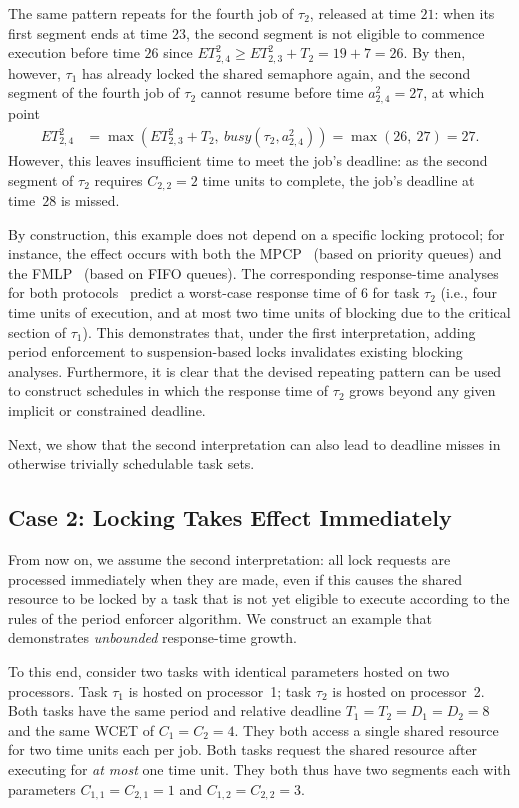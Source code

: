 The same pattern repeats for the fourth job of $\tau_2$, released at time $21$: when its first segment ends at time $23$, the second segment is not eligible to commence execution before time $26$ since $ET_{2,4}^2 \geq ET_{2,3}^2 + T_2 = 19 + 7 = 26$. By then, however, $\tau_1$ has already locked the shared semaphore again, and the second segment of the fourth job of $\tau_2$ cannot resume before time $a^2_{2,4} = 27$, at which point
\begin{align*}
	ET_{2,4}^2 & = \max\left(ET_{2,3}^2 + T_2,\ \mathit{busy}(\tau_2, a^2_{2,4})\right) =\max(26,\ 27) = 27.
\end{align*}
However, this leaves insufficient time to meet the job's deadline: as the second segment of $\tau_2$ requires $C_{2,2} = 2$ time units to complete, the job's deadline at time~$28$ is  missed.

By construction, this example does not depend on a specific locking protocol; for instance, the effect occurs with both the MPCP~\cite{Ra:90} (based on priority queues) and the FMLP~\cite{BLBA:07,BA:08} (based on FIFO queues).  The corresponding response-time analyses for both protocols~\cite{Br:13,LNR:09} predict a worst-case response time of $6$ for task $\tau_2$ (i.e., four time units of execution, and at most two time units of blocking due to the critical section of $\tau_1$). 
This demonstrates that, under the first interpretation, adding period enforcement to suspension-based locks invalidates existing blocking analyses. Furthermore, it is clear that the devised repeating pattern can be used to construct schedules in which the response time of $\tau_2$  grows beyond any given implicit or constrained deadline.

Next, we show that the second interpretation can also lead to deadline misses in otherwise trivially schedulable task sets.

\subsection{Case 2: Locking Takes Effect Immediately}
 From now on, we assume the second interpretation: all lock requests are processed immediately when they are made, even if this causes the shared resource to be locked by a task that is not yet eligible to execute according to  the rules of the period enforcer algorithm. We construct an example that demonstrates \emph{unbounded} response-time growth.

To this end, consider two tasks with identical parameters hosted on two processors. Task $\tau_1$ is hosted on processor~1; task $\tau_2$ is hosted on processor~2. Both tasks have the same period and relative deadline $T_1 = T_2 = D_1 = D_2 = 8$ and the same WCET of $C_1 = C_2 = 4$. They both access a single shared resource for two time units each per job. Both tasks request the shared resource after executing for \emph{at most} one time unit. They both thus have two segments each with parameters $C_{1,1} = C_{2,1} = 1$ and $C_{1,2} = C_{2,2} = 3$. 

